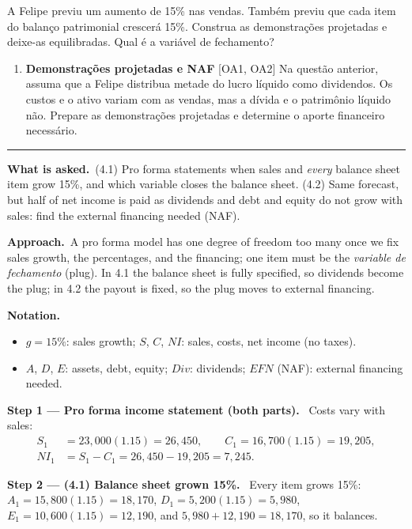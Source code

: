\documentclass[11pt,a4paper]{article}
\newcommand{\notation}{\par\noindent\textbf{Notation.}}
\newcommand{\step}[2]{\par\medskip\noindent\textbf{Step #1 --- #2.}~}
\newcommand{\asked}{\par\medskip\noindent\textbf{What is asked.}~}
\newcommand{\approach}{\par\smallskip\noindent\textbf{Approach.}~}
\newcommand{\EFN}{\mathit{EFN}}
\providecommand{\tightlist}{\setlength{\itemsep}{0pt}\setlength{\parskip}{0pt}}
\newcommand{\stmtend}{\par\endgroup\nopagebreak\noindent\rule{\linewidth}{0.4pt}\par\medskip}
\begin{document}
A Felipe previu um aumento de 15\% nas vendas. Também previu que cada item do balanço patrimonial
crescerá 15\%. Construa as demonstrações projetadas e deixe-as equilibradas. Qual é a variável de
fechamento?

\begin{enumerate}
\def\labelenumi{\arabic{enumi}.}
\setcounter{enumi}{1}
\tightlist
\item
  \textbf{Demonstrações projetadas e NAF} {[}OA1, OA2{]} Na questão anterior, assuma que a Felipe
  distribua metade do lucro líquido como dividendos. Os custos e o ativo variam com as vendas, mas a
  dívida e o patrimônio líquido não. Prepare as demonstrações projetadas e determine o aporte
  financeiro necessário.
\end{enumerate}
\stmtend

\asked (4.1) Pro forma statements when sales and \emph{every} balance sheet item grow 15\%, and which
variable closes the balance sheet. (4.2) Same forecast, but half of net income is paid as dividends
and debt and equity do not grow with sales: find the external financing needed (NAF).

\approach A pro forma model has one degree of freedom too many once we fix sales growth, the
percentages, and the financing; one item must be the \emph{variable de fechamento} (plug). In 4.1 the
balance sheet is fully specified, so dividends become the plug; in 4.2 the payout is fixed, so the
plug moves to external financing.

\notation
\begin{itemize}
  \item $g=15\%$: sales growth; $S$, $C$, $NI$: sales, costs, net income (no taxes).
  \item $A$, $D$, $E$: assets, debt, equity; $Div$: dividends; $\EFN$ (NAF): external financing needed.
\end{itemize}

\step{1}{Pro forma income statement (both parts)} Costs vary with sales:
\begin{align}
  S_1 &= 23{,}000(1.15) = 26{,}450, \qquad C_1 = 16{,}700(1.15) = 19{,}205, \label{r2ce3-S}\\
  NI_1 &= S_1-C_1 = 26{,}450-19{,}205 = 7{,}245. \label{r2ce3-NI}
\end{align}

\step{2}{(4.1) Balance sheet grown 15\%} Every item grows 15\%:
$A_1=15{,}800(1.15)=18{,}170$, $D_1=5{,}200(1.15)=5{,}980$, $E_1=10{,}600(1.15)=12{,}190$, and
$5{,}980+12{,}190=18{,}170$, so it balances.
\end{document}
